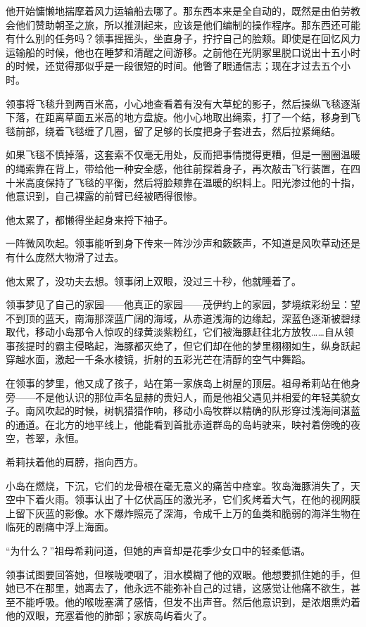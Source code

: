 \documentclass[AutoFakeBold=true]{book}
\begin{document}
他开始慵懒地揣摩着风力运输船去哪了。那东西本来是全自动的，既然是由伯劳教会他们赞助朝圣之旅，所以推测起来，应该是他们编制的操作程序。那东西还可能有什么别的任务吗？领事摇摇头，坐直身子，拧拧自己的脸颊。即使是在回忆风力运输船的时候，他也在睡梦和清醒之间游移。之前他在光阴冢里脱口说出十五小时的时候，还觉得那似乎是一段很短的时间。他瞥了眼通信志；现在才过去五个小时。

领事将飞毯升到两百米高，小心地查看着有没有大草蛇的影子，然后操纵飞毯逐渐下落，在距离草面五米高的地方盘旋。他小心地取出绳索，打了一个结，移身到飞毯前部，绕着飞毯缠了几圈，留了足够的长度把身子套进去，然后拉紧绳结。

如果飞毯不慎掉落，这套索不仅毫无用处，反而把事情搅得更糟，但是一圈圈温暖的绳索靠在背上，带给他一种安全感，他往前探着身子，再次敲击飞行装置，在四十米高度保持了飞毯的平衡，然后将脸颊靠在温暖的织料上。阳光渗过他的十指，他意识到，自己裸露的前臂已经被晒得很惨。

他太累了，都懒得坐起身来捋下袖子。

一阵微风吹起。领事能听到身下传来一阵沙沙声和簌簌声，不知道是风吹草动还是有什么庞然大物滑了过去。

他太累了，没功夫去想。领事闭上双眼，没过三十秒，他就睡着了。

\vspace*{1em}

领事梦见了自己的家园——他真正的家园——茂伊约上的家园，梦境缤彩纷呈：望不到顶的蓝天，南海那深蓝广阔的海域，从赤道浅海的边缘起，深蓝色逐渐被碧绿取代，移动小岛那令人惊叹的绿黄淡紫粉红，它们被海豚赶往北方放牧……自从领事孩提时的霸主侵略起，海豚都灭绝了，但它们却在他的梦里栩栩如生，纵身跃起穿越水面，激起一千条水棱镜，折射的五彩光芒在清醇的空气中舞蹈。

在领事的梦里，他又成了孩子，站在第一家族岛上树屋的顶层。祖母希莉站在他身旁——不是他认识的那位声名显赫的贵妇人，而是他祖父遇见并相爱的年轻美貌女子。南风吹起的时候，树帆猎猎作响，移动小岛牧群以精确的队形穿过浅海间湛蓝的通道。在北方的地平线上，他能看到首批赤道群岛的岛屿驶来，映衬着傍晚的夜空，苍翠，永恒。

希莉扶着他的肩膀，指向西方。

小岛在燃烧，下沉，它们的龙骨根在毫无意义的痛苦中痉挛。牧岛海豚消失了，天空中下着火雨。领事认出了十亿伏高压的激光矛，它们炙烤着大气，在他的视网膜上留下灰蓝的影像。水下爆炸照亮了深海，令成千上万的鱼类和脆弱的海洋生物在临死的剧痛中浮上海面。

``为什么？''祖母希莉问道，但她的声音却是花季少女口中的轻柔低语。

领事试图要回答她，但喉咙哽咽了，泪水模糊了他的双眼。他想要抓住她的手，但她已不在那里，她{\kaishu 离去了}，他永远不能弥补自己的过错，这感觉让他痛不欲生，甚至不能呼吸。他的喉咙塞满了感情，但发不出声音。然后他意识到，是浓烟熏灼着他的双眼，充塞着他的肺部；家族岛屿着火了。
\end{document}

